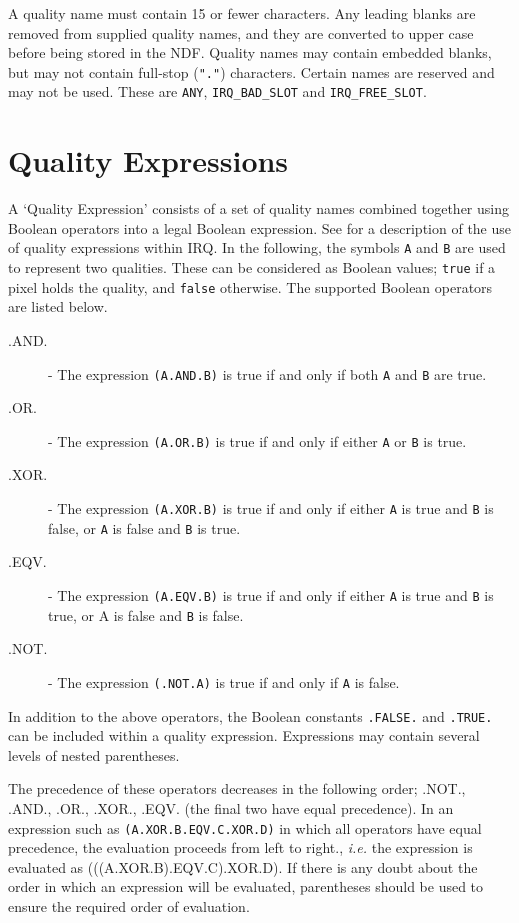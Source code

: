 \documentclass[twoside,11pt,nolof]{starlink}
\begin{document}
A quality name must contain 15 or fewer characters. Any leading blanks
are removed from supplied quality names, and they are converted to
upper case before being stored in the NDF. Quality names may contain
embedded blanks, but may not contain full-stop (\texttt{"."}) characters.
Certain names are reserved and may not be used. These are \texttt{ANY},
\texttt{IRQ\_BAD\_SLOT} and \texttt{IRQ\_FREE\_SLOT}.

\section{Quality Expressions}
\label{SEC:QEXP}

A `Quality Expression' consists of a set of quality names combined
together using Boolean operators into a legal Boolean expression. See
for a description of the use of quality expressions within IRQ. In the
following, the symbols \texttt{A} and \texttt{B} are used to represent two
qualities. These can be considered as Boolean values; \texttt{true} if a
pixel holds the quality, and \texttt{false} otherwise. The supported
Boolean operators are listed below.

\begin {description}
\item [.AND.] - The expression \texttt{(A.AND.B)} is true if and only if
both \texttt{A} and \texttt{B} are true.
\item [.OR.] - The expression \texttt{(A.OR.B)} is true if and only if
either \texttt{A} or \texttt{B} is true.
\item [.XOR.] - The
expression \texttt{(A.XOR.B)} is true if and only if either \texttt{A} is true and \texttt{B}
is false, or \texttt{A} is false and \texttt{B} is true.
\item [.EQV.] - The expression \texttt{(A.EQV.B)} is true if and only if either \texttt{A}
is true and \texttt{B} is true, or A is false and \texttt{B} is false.
\item [.NOT.] - The expression \texttt{(.NOT.A)} is true if and only if \texttt{A} is
false.
\end{description}
In addition to the above operators, the Boolean constants \texttt{.FALSE.} and \texttt{.TRUE.} can be included within a quality expression.
Expressions may contain several levels of nested parentheses.

The precedence of these operators decreases in the following order;
.NOT., .AND., .OR., .XOR., .EQV. (the final two have equal
precedence). In an expression such as \texttt{(A.XOR.B.EQV.C.XOR.D)} in
which all operators have equal precedence, the evaluation proceeds
from left to right., \emph{i.e.} the expression is evaluated as
(((A.XOR.B).EQV.C).XOR.D). If there is any doubt about the order in
which an expression will be evaluated, parentheses should be used to
ensure the required order of evaluation.
\end{document}
